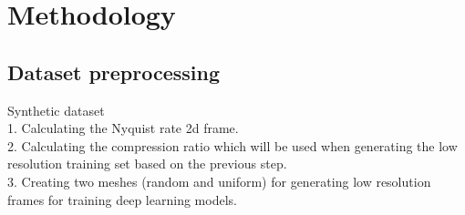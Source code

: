 \section{Methodology}
\subsection{Dataset preprocessing}
Synthetic dataset~\cite{kudela_pawel_2021_5414555}\\
1. Calculating the Nyquist rate 2d frame. \\
2. Calculating the compression ratio which will be used when generating the low resolution training set based on the previous step. \\
3. Creating two meshes (random and uniform) for generating low resolution frames for training deep learning models.\\